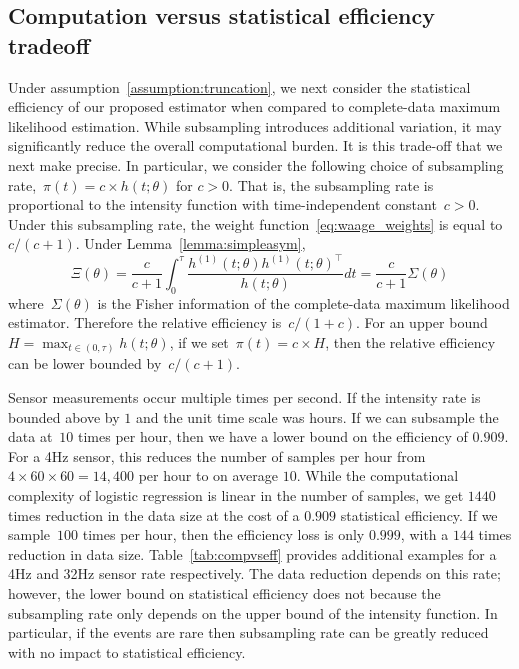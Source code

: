 \documentclass[12pt]{amsart}
\begin{document}

\subsection{Computation versus statistical efficiency tradeoff}

Under assumption~\ref{assumption:truncation}, we next consider the statistical efficiency of our proposed estimator when compared to complete-data maximum likelihood estimation. While subsampling introduces additional variation, it may significantly reduce the overall computational burden. It is this trade-off that we next make precise. In particular, we consider the following choice of subsampling rate,~$\pi(t) = c \times h(t; \theta)$ for $c>0$. That is, the subsampling rate is proportional to the intensity function with time-independent constant~$c > 0$. Under this subsampling rate, the weight function~\eqref{eq:waage_weights} is equal to $c/ (c+1)$. Under Lemma~\ref{lemma:simpleasym},
\[
\Xi (\theta) = \frac{c}{c+1} \int_0^\tau \frac{ h^{(1)} (t; \theta)
  h^{(1)} (t; \theta)^\top}{h (t; \theta)} dt = \frac{c}{c+1} \Sigma (\theta)
\]
where~$\Sigma(\theta)$ is the Fisher information of the complete-data maximum likelihood estimator.
Therefore the relative efficiency is~$c/(1+c)$. For an upper bound~$H = \max_{t \in (0,\tau)} h(t;\theta)$, if we set~$\pi (t) = c \times H$, then the relative efficiency can be lower bounded by~$c / (c+1)$.

Sensor measurements occur multiple times per second.  If the intensity rate is bounded above by $1$ and the unit time scale was hours. If we can subsample the data at~$10$ times per hour, then we have a lower bound on the efficiency of $0.909$. For a 4Hz sensor, this reduces the number of samples per hour from~$4 \times 60 \times 60 = 14,400$ per hour to on average $10$. While the computational complexity of logistic regression is linear in the number of samples, we get $1440$ times reduction in the data size at the cost of a $0.909$ statistical efficiency. If we sample~$100$ times per hour, then the efficiency loss is only $0.999$, with a $144$ times reduction in data size. Table~\ref{tab:compvseff} provides additional examples for a 4Hz and 32Hz sensor rate respectively.  The data reduction depends on this rate; however, the lower bound on statistical efficiency does not because the subsampling rate only depends on the upper bound of the intensity function. In particular, if the events are rare then subsampling rate can be greatly reduced with no impact to statistical efficiency.
\end{document}
